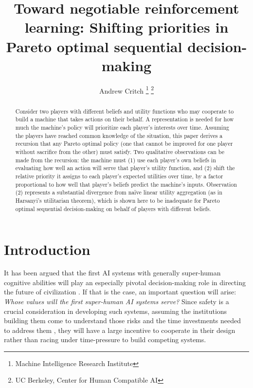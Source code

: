 \documentclass{article}  %
\title{\LARGE \bf
Toward negotiable reinforcement learning: Shifting priorities in Pareto optimal sequential decision-making
}
\author{Andrew Critch%
\thanks{Machine Intelligence Research Institute}
\thanks{UC Berkeley, Center for Human Compatible AI}%
}
\begin{document}
\maketitle
\thispagestyle{empty}
\pagestyle{empty}


\begin{abstract}
Consider two players with different beliefs and utility functions who may cooperate to build 	a machine that takes actions on their behalf.  A representation is needed for how much the machine's policy will prioritize each player's interests over time.  Assuming the players have reached common knowledge of the situation, this paper derives a recursion that any Pareto optimal policy (one that cannot be improved for one player without sacrifice from the other) must satisfy.  Two qualitative observations can be made from the recursion: the machine must (1) use each player's own beliefs in evaluating how well an action will serve that player's utility function, and (2) shift the relative priority it assigns to each player's expected utilities over time, by a factor proportional to how well that player's beliefs predict the machine's inputs.  Observation (2) represents a substantial divergence from na\"{i}ve linear utility aggregation (as in Harsanyi's utilitarian theorem), which is shown here to be inadequate for Pareto optimal sequential decision-making on behalf of players with different beliefs.
\end{abstract}



\section{Introduction}

It has been argued that the first AI systems with generally super-human cognitive abilities will play an especially pivotal decision-making role in directing the future of civilization \cite{Bo14}.  If that is the case, an important question will arise: \emph{Whose values will the first super-human AI systems serve?}  Since safety is a crucial consideration in developing such systems, assuming the institutions building them come to understand those risks and the time investments needed to address them \cite{Ba16}, they will have a large incentive to cooperate in their design rather than racing under time-pressure to build competing systems.
\end{document}
